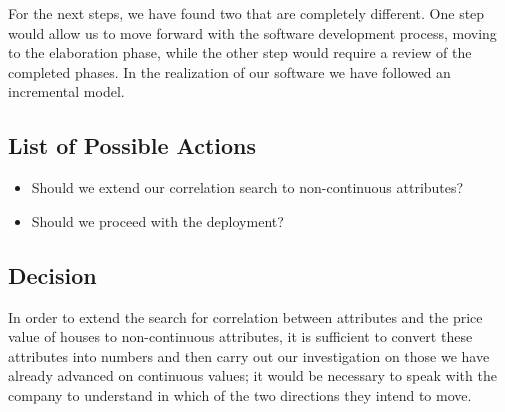 For the next steps, we have found two that are completely different. One step would allow us to move forward with the software development process, moving to the elaboration phase, while the other step would require a review of the completed phases. In the realization of our software we have followed an incremental model.

\subsection{List of Possible Actions}
\begin{itemize}
    \item Should we extend our correlation search to non-continuous attributes?
    \item Should we proceed with the deployment?
\end{itemize}

\subsection{Decision}

In order to extend the search for correlation between attributes and the price value of houses to non-continuous attributes, it is sufficient to convert these attributes into numbers and then carry out our investigation on those we have already advanced on continuous values; it would be necessary to speak with the company to understand in which of the two directions they intend to move.